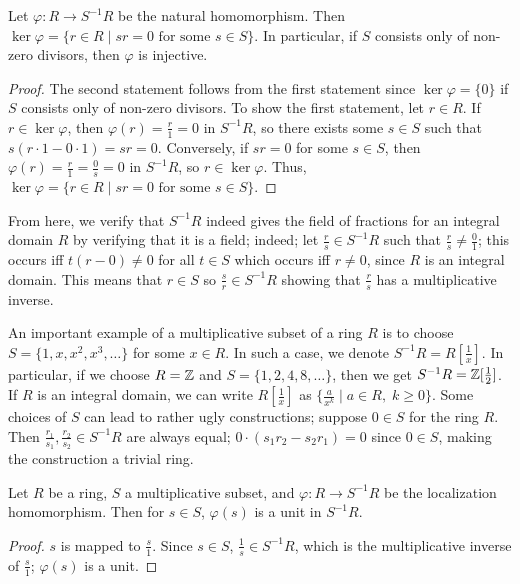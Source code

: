 \begin{proposition}
    Let $\varphi : R \to S^{-1}R$ be the natural homomorphism. Then $\ker \varphi = \{r \in R \mid sr = 0 \text{ for some } s \in S\}$. In particular, if $S$ consists only of non-zero divisors, then $\varphi$ is injective.
\end{proposition}

\begin{proof}
    The second statement follows from the first statement since $\ker \varphi = \{0\}$ if $S$ consists only of non-zero divisors. To show the first statement, let $r \in R$. If $r \in \ker \varphi$, then $\varphi(r) = \frac{r}{1} = 0$ in $S^{-1}R$, so there exists some $s \in S$ such that $s(r\cdot 1 - 0\cdot 1) = sr = 0$. Conversely, if $sr = 0$ for some $s \in S$, then $\varphi(r) = \frac{r}{1} = \frac{0}{s} = 0$ in $S^{-1}R$, so $r \in \ker \varphi$. Thus, $\ker \varphi = \{r \in R \mid sr = 0 \text{ for some } s \in S\}$.
\end{proof}

From here, we verify that $S^{-1}R$ indeed gives the field of fractions for an integral domain $R$ by verifying that it is a field; indeed; let $\frac{r}{s} \in S^{-1}R$ such that $\frac{r}{s} \neq \frac{0}{1}$; this occurs iff $t(r-0) \neq 0$ for all $t \in S$ which occurs iff $r \neq 0$, since $R$ is an integral domain. This means that $r \in S$ so $\frac{s}{r} \in S^{-1}R$ showing that $\frac{r}{s}$ has a multiplicative inverse.

An important example of a multiplicative subset of a ring $R$ is to choose $S = \{1,x,x^{2},x^{3},\ldots\}$ for some $x \in R$. In such a case, we denote $S^{-1}R = R[\frac{1}{x}]$. In particular, if we choose $R = \mathbb{Z}$ and $S = \{1,2,4,8,\ldots\}$, then we get $S^{-1}R = \mathbb{Z}[\frac{1}{2}]$. If $R$ is an integral domain, we can write $R[\frac{1}{x}]$ as $\{\frac{a}{x^{k}} \mid a \in R, \; k \geq 0\}$. Some choices of $S$ can lead to rather ugly constructions; suppose $0 \in S$ for the ring $R$. Then $\frac{r_{1}}{s_{1}}, \frac{r_{2}}{s_{2}} \in S^{-1}R$ are always equal; $0 \cdot (s_{1}r_{2}-s_{2}r_{1}) = 0$ since $0 \in S$, making the construction a trivial ring.

\begin{proposition}
    Let $R$ be a ring, $S$ a multiplicative subset, and $\varphi :R \to S^{-1}R$ be the localization homomorphism. Then for $s \in S$, $\varphi(s)$ is a unit in $S^{-1}R$.
\end{proposition}

\begin{proof}
    $s$ is mapped to $\frac{s}{1}$. Since $s \in S$, $\frac{1}{s} \in S^{-1}R$, which is the multiplicative inverse of $\frac{s}{1}$; $\varphi(s)$ is a unit.
\end{proof}

